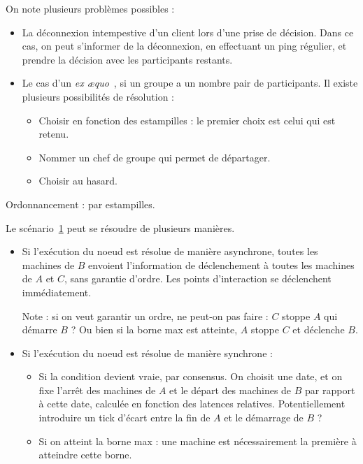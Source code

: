\documentclass{article}
\newcommand\triggers{points d'interaction\xspace}
\begin{document}
On note plusieurs problèmes possibles : 
\begin{itemize}
    \item La déconnexion intempestive d'un client lors d'une prise de décision. 
    Dans ce cas, on peut s'informer de la déconnexion, en effectuant un ping régulier, et prendre la décision avec les participants restants. 
    \item Le cas d'un \textit{ex æquo}~, si un groupe a un nombre pair de participants.
    Il existe plusieurs possibilités de résolution : 
    \begin{itemize}
        \item Choisir en fonction des estampilles : le premier choix est celui qui est retenu.
        \item Nommer un chef de groupe qui permet de départager.
        \item Choisir au hasard.
    \end{itemize}
\end{itemize}
Ordonnancement : par estampilles.

\begin{figure}[h]
    \centering
    \begin{tikzpicture}
    
    \end{tikzpicture}
    \label{scenar.trigger-1}
\end{figure}

Le scénario~\ref{scenar.trigger-1} peut se résoudre de plusieurs manières.

\begin{itemize}
    \item Si l'exécution du noeud est résolue de manière asynchrone, toutes les machines de $B$ envoient l'information de déclenchement à toutes les machines de $A$ et $C$, sans garantie d'ordre. Les \triggers se déclenchent immédiatement.
    
    Note : si on veut garantir un ordre, ne peut-on pas faire : $C$ stoppe $A$ qui démarre $B$ ? Ou bien si la borne max est atteinte, $A$ stoppe $C$ et déclenche $B$.
    
    \item Si l'exécution du noeud est résolue de manière synchrone : 
    \begin{itemize}
        \item Si la condition devient vraie, par consensus. On choisit une date, et on fixe l'arrêt des machines de $A$ et le départ des machines de $B$ par rapport à cette date, calculée en fonction des latences relatives. Potentiellement introduire un tick d'écart entre la fin de $A$ et le démarrage de $B$ ?
        \item Si on atteint la borne max : une machine est nécessairement la première à atteindre cette borne.
    \end{itemize}
\end{itemize}
\end{document}
